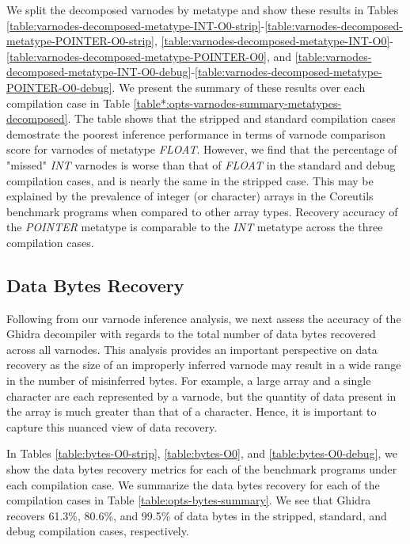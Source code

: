 \documentclass[conference]{IEEEtran}
\begin{document}
We split the decomposed varnodes by metatype and show these results in Tables \ref{table:varnodes-decomposed-metatype-INT-O0-strip}-\ref{table:varnodes-decomposed-metatype-POINTER-O0-strip}, \ref{table:varnodes-decomposed-metatype-INT-O0}-\ref{table:varnodes-decomposed-metatype-POINTER-O0}, and \ref{table:varnodes-decomposed-metatype-INT-O0-debug}-\ref{table:varnodes-decomposed-metatype-POINTER-O0-debug}. We present the summary of these results over each compilation case in Table \ref{table*:opts-varnodes-summary-metatypes-decomposed}. The table shows that the stripped and standard compilation cases demostrate the poorest inference performance in terms of varnode comparison score for varnodes of metatype \emph{FLOAT}. However, we find that the percentage of "missed" \emph{INT} varnodes is worse than that of \emph{FLOAT} in the standard and debug compilation cases, and is nearly the same in the stripped case. This may be explained by the prevalence of integer (or character) arrays in the Coreutils benchmark programs when compared to other array types. Recovery accuracy of the \emph{POINTER} metatype is comparable to the \emph{INT} metatype across the three compilation cases.

\subsection{Data Bytes Recovery}

Following from our varnode inference analysis, we next assess the accuracy of the Ghidra decompiler with regards to the total number of data bytes recovered across all varnodes. This analysis provides an important perspective on data recovery as the size of an improperly inferred varnode may result in a wide range in the number of misinferred bytes. For example, a large array and a single character are each represented by a varnode, but the quantity of data present in the array is much greater than that of a character. Hence, it is important to capture this nuanced view of data recovery.



In Tables \ref{table:bytes-O0-strip}, \ref{table:bytes-O0}, and \ref{table:bytes-O0-debug}, we show the data bytes recovery metrics for each of the benchmark programs under each compilation case. We summarize the data bytes recovery for each of the compilation cases in Table \ref{table:opts-bytes-summary}. We see that Ghidra recovers 61.3\%, 80.6\%, and 99.5\% of data bytes in the stripped, standard, and debug compilation cases, respectively.
\end{document}
